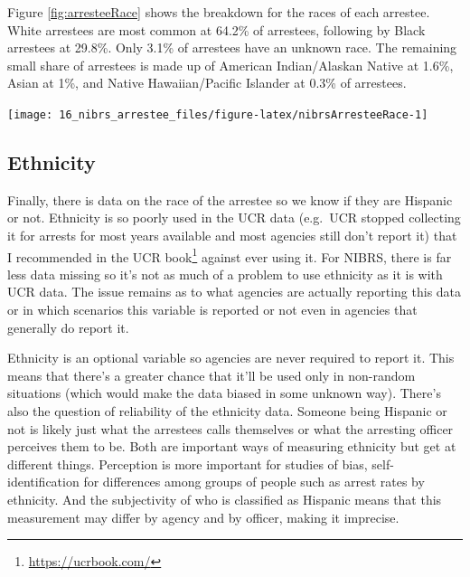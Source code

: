 \documentclass[
]{krantz}
\let\origfigure\figure
\let\endorigfigure\endfigure
\renewenvironment{figure}[1][2] {
    \expandafter\origfigure\expandafter[H]
} {
    \endorigfigure
}
\renewcommand{\href}[2]{#2\footnote{\url{#1}}}
\begin{document}
Figure \ref{fig:arresteeRace} shows the breakdown for the
races of each arrestee. White arrestees are most common at
64.2\% of arrestees, following by Black arrestees at 29.8\%.
Only 3.1\% of arrestees have an unknown race. The remaining
small share of arrestees is made up of American
Indian/Alaskan Native at 1.6\%, Asian at 1\%, and Native
Hawaiian/Pacific Islander at 0.3\% of arrestees.

\begin{figure}

{\centering \texttt{[image: 16\_nibrs\_arrestee\_files/figure-latex/nibrsArresteeRace-1]} 

}

\caption{The share of arrestees by race, 1991-2022.}\label{fig:nibrsArresteeRace}
\end{figure}

\subsection{Ethnicity}\label{ethnicity-4}

Finally, there is data on the race of the arrestee so we
know if they are Hispanic or not. Ethnicity is so poorly
used in the UCR data (e.g.~UCR stopped collecting it for
arrests for most years available and most agencies still
don't report it) that I recommended in the
\href{https://ucrbook.com/}{UCR book} against ever using it.
For NIBRS, there is far less data missing so it's not as
much of a problem to use ethnicity as it is with UCR data.
The issue remains as to what agencies are actually reporting
this data or in which scenarios this variable is reported or
not even in agencies that generally do report it.

Ethnicity is an optional variable so agencies are never
required to report it. This means that there's a greater
chance that it'll be used only in non-random situations
(which would make the data biased in some unknown way).
There's also the question of reliability of the ethnicity
data. Someone being Hispanic or not is likely just what the
arrestees calls themselves or what the arresting officer
perceives them to be. Both are important ways of measuring
ethnicity but get at different things. Perception is more
important for studies of bias, self-identification for
differences among groups of people such as arrest rates by
ethnicity. And the subjectivity of who is classified as
Hispanic means that this measurement may differ by agency
and by officer, making it imprecise.
\end{document}
